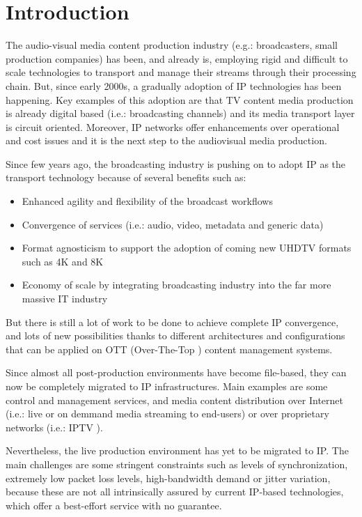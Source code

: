 \cleardoublepage
{}
\chapter*{Introduction}
 
The audio-visual media content production industry (e.g.: broadcasters, small production companies) has been, and already is, employing rigid and difficult to scale technologies to transport and manage their streams through their processing chain. But, since early 2000s, a gradually adoption of IP technologies has been happening. Key examples of this adoption are that TV content media production is already digital based (i.e.: broadcasting channels) and its media transport layer is circuit oriented. Moreover, IP networks offer enhancements over operational and cost issues and it is the next step to the audiovisual media production.

Since few years ago, the broadcasting industry is pushing on to adopt IP as the transport technology because of several benefits such as:

\begin{itemize}
  \item Enhanced agility and flexibility of the broadcast workflows
  \item Convergence of services (i.e.: audio, video, metadata and generic data)
  \item Format agnosticism to support the adoption of coming new UHDTV formats such as 4K and 8K 
  \item Economy of scale by integrating broadcasting industry into the far more massive IT industry
\end{itemize}

But there is still a lot of work to be done to achieve complete IP convergence, and lots of new possibilities thanks to different architectures and configurations that can be applied on OTT (Over-The-Top \cite{ottVSiptv}) content management systems. 

Since almost all post-production environments have become file-based, they can now be completely migrated to IP infrastructures. Main examples are some control and management services, and media content distribution over Internet (i.e.: live or on demmand media streaming to end-users) or over proprietary networks (i.e.: IPTV \cite{ottVSiptv}).

Nevertheless, the live production environment has yet to be migrated to IP. The main challenges are some stringent constraints such as levels of synchronization, extremely low packet loss levels, high-bandwidth demand or jitter variation, because these are not all intrinsically assured by current IP-based technologies, which offer a best-effort service with no guarantee.

